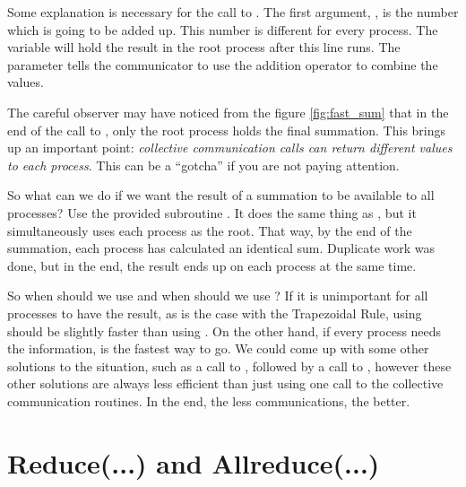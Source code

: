 

Some explanation is necessary for the call to . The first argument, , is the number which is going to be added up. This number is different for every process. The variable  will hold the result in the root process after this line runs. The parameter  tells the communicator to use the addition operator to combine the values.

The careful observer may have noticed from the figure \ref{fig:fast_sum} that in the end of the call to , only the root process holds the final summation. This brings up an important point: \emph{collective communication calls can return different values to each process}. This can be a ``gotcha'' if you are not paying attention.

So what can we do if we want the result of a summation to be available to all processes? Use the provided subroutine . It does the same thing as , but it simultaneously uses each process as the root. That way, by the end of the summation, each process has calculated an identical sum. Duplicate work was done, but in the end, the result ends up on each process at the same time.

So when should we use  and when should we use ? If it is unimportant for all processes to have the result, as is the case with the Trapezoidal Rule, using  should be slightly faster than using . On the other hand, if every process needs the information,  is the fastest way to go. We could come up with some other solutions to the situation, such as a call to , followed by a call to , however these other solutions are always less efficient than just using one call to the collective communication routines. In the end, the less communications, the better.



\section*{Reduce(...) and Allreduce(...)}

